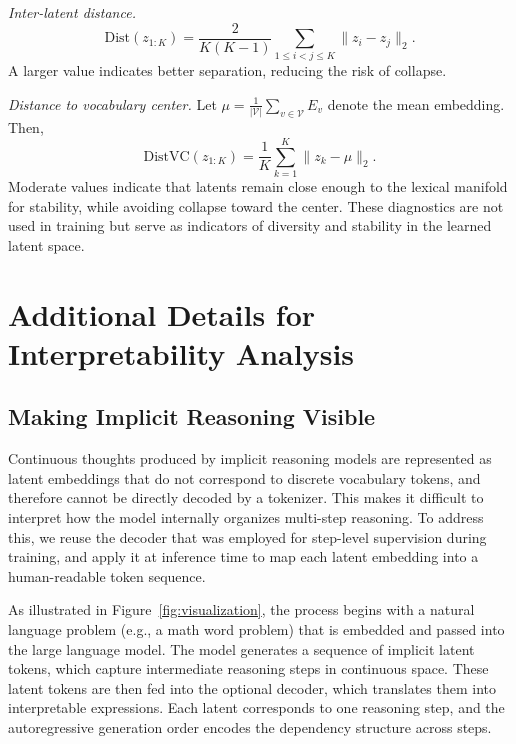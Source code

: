 \textit{Inter-latent distance.}  
\begin{equation}
\mathrm{Dist}(z_{1:K})
= \frac{2}{K(K-1)} \sum_{1 \le i < j \le K} \big\| z_i - z_j \big\|_2 .
\end{equation}
A larger value indicates better separation, reducing the risk of collapse.

\textit{Distance to vocabulary center.}  
Let $\mu = \tfrac{1}{|\mathcal{V}|}\sum_{v\in\mathcal{V}} E_v$ denote the mean embedding. Then,
\begin{equation}
\mathrm{DistVC}(z_{1:K})
= \frac{1}{K} \sum_{k=1}^{K} \big\| z_k - \mu \big\|_2 .
\end{equation}
Moderate values indicate that latents remain close enough to the lexical manifold for stability, while avoiding collapse toward the center. These diagnostics are not used in training but serve as indicators of diversity and stability in the learned latent space.



\section{Additional Details for Interpretability Analysis}
\label{appendix:interpretability}

\subsection{Making Implicit Reasoning Visible}
Continuous thoughts produced by implicit reasoning models are represented as latent embeddings that do not correspond to discrete vocabulary tokens, and therefore cannot be directly decoded by a tokenizer. This makes it difficult to interpret how the model internally organizes multi-step reasoning. To address this, we reuse the decoder that was employed for step-level supervision during training, and apply it at inference time to map each latent embedding into a human-readable token sequence.  

As illustrated in Figure~\ref{fig:visualization}, the process begins with a natural language problem (e.g., a math word problem) that is embedded and passed into the large language model. The model generates a sequence of implicit latent tokens, which capture intermediate reasoning steps in continuous space. These latent tokens are then fed into the optional decoder, which translates them into interpretable expressions. Each latent corresponds to one reasoning step, and the autoregressive generation order encodes the dependency structure across steps.  

